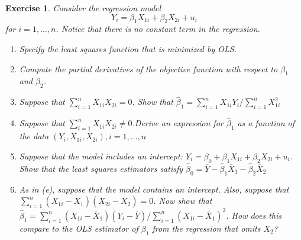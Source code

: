 \documentclass{article}
\newtheorem{exercise}[theorem]{Exercise}
\begin{document}
\begin{exercise} %
Consider the regression model
\begin{equation*}
    Y_i = \beta_1 X_{1i} + \beta_2 X_{2i} + u_i
\end{equation*}
for $i = 1, \dots, n$. Notice that there is no constant term in the regression.
    \begin{enumerate}[label=(\alph*)]
    \item Specify the least squares function that is minimized by OLS.
    \item Compute the partial derivatives of the objective function with respect to
$\beta_1$ and $\beta_2$.
    \item Suppose that $\sum_{i=1}^n  X_{1i}X_{2i}=0$. Show that $\hat{\beta}_1=\sum_{i=1}^n X_{1i}Y_i/\sum_{i=1}^n X_{1i}^2$
    \item Suppose that $\sum_{i=1}^n  X_{1i}X_{2i}\neq0$.Derive an expression for $\hat{\beta}_1$ as a function of the data $(Y_i,  X_{1i}, X_{2i}), i = 1, \dots, n$
    \item Suppose that the model includes an intercept: $ Y_i = \beta_0 + \beta_1 X_{1i} + \beta_2 X_{2i} + u_i$. Show that the least squares estimators satisfy $\hat{\beta}_0=\overline{Y}-\hat{\beta}_1\overline{X}_{1}-\hat{\beta}_2\overline{X}_{2}$
    \item As in (e), suppose that the model contains an intercept. Also, suppose that $\sum_{i=1}^n  (X_{1i}-\overline{X}_{1})(X_{2i}-\overline{X}_{2})=0$. Now show that $\hat{\beta}_1=\sum_{i=1}^n (X_{1i}-\overline{X}_{1})(Y_{i}-\overline{Y})/\sum_{i=1}^n (X_{1i}-\overline{X}_{1})^2$. How does this compare to the OLS estimator of $\beta_1$ from the regression that omits $X_2$?
    \end{enumerate}
\end{exercise}
\end{document}
